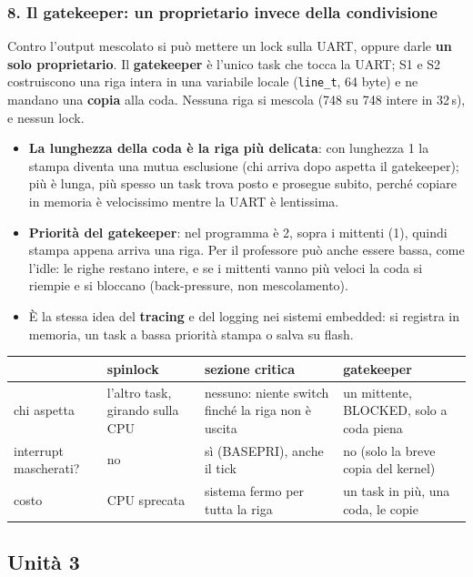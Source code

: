 \subsubsection*{8. Il gatekeeper: un proprietario invece della condivisione}
Contro l'output mescolato si può mettere un lock sulla UART, oppure darle \textbf{un solo proprietario}. Il \textbf{gatekeeper} è l'unico task che tocca la UART; S1 e S2 costruiscono una riga intera in una variabile locale (\texttt{line\_t}, 64 byte) e ne mandano una \textbf{copia} alla coda. Nessuna riga si mescola (748 su 748 intere in 32\,s), e nessun lock.
\begin{itemize}
    \item \textbf{La lunghezza della coda è la riga più delicata}: con lunghezza 1 la stampa diventa una mutua esclusione (chi arriva dopo aspetta il gatekeeper); più è lunga, più spesso un task trova posto e prosegue subito, perché copiare in memoria è velocissimo mentre la UART è lentissima.
    \item \textbf{Priorità del gatekeeper}: nel programma è 2, sopra i mittenti (1), quindi stampa appena arriva una riga. Per il professore può anche essere bassa, come l'idle: le righe restano intere, e se i mittenti vanno più veloci la coda si riempie e si bloccano (back-pressure, non mescolamento).
    \item È la stessa idea del \textbf{tracing} e del logging nei sistemi embedded: si registra in memoria, un task a bassa priorità stampa o salva su flash.
\end{itemize}
\begin{center}
\footnotesize
\begin{tabular}{P{0.16} P{0.24} P{0.24} P{0.24}}
    \hline
    & \textbf{spinlock} & \textbf{sezione critica} & \textbf{gatekeeper} \\
    \hline
    chi aspetta & l'altro task, girando sulla CPU & nessuno: niente switch finché la riga non è uscita & un mittente, BLOCKED, solo a coda piena \\
    interrupt mascherati? & no & sì (BASEPRI), anche il tick & no (solo la breve copia del kernel) \\
    costo & CPU sprecata & sistema fermo per tutta la riga & un task in più, una coda, le copie \\
    \hline
\end{tabular}
\end{center}

\subsection{Unità 3}
